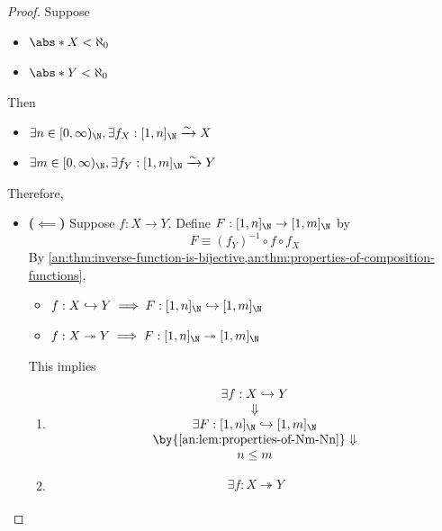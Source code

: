 \begin{proof}
  Suppose
  \begin{itemize}
    \item $\abs*{X} < \aleph_{0}$
    \item $\abs*{Y} < \aleph_{0}$
  \end{itemize}
  Then
  \begin{itemize}
    \item $\exists n \in [0, \infty)_{\N}, \exists f_{X}: [1, n]_{\N} \xrightarrow{\sim} X$
    \item $\exists m \in [0, \infty)_{\N}, \exists f_{Y}: [1, m]_{\N} \xrightarrow{\sim} Y$
  \end{itemize}
  Therefore,
  \begin{itemize}
    \item \textbf{($\impliedby$)} Suppose $f: X \to Y$. Define $F: [1, n]_{\N} \to [1, m]_{\N}$ by
          \[
            F \equiv (f_{Y})^{-1} \circ f \circ f_{X}
          \]
          By \cref{an:thm:inverse-function-is-bijective,an:thm:properties-of-composition-functions},
          \begin{itemize}
            \item $f: X \hookrightarrow Y \implies F: [1, n]_{\N} \hookrightarrow [1, m]_{\N}$
            \item $f: X \twoheadrightarrow Y \implies F: [1, n]_{\N} \twoheadrightarrow [1, m]_{\N}$
          \end{itemize}
          This implies
          \begin{enumerate}[label=\textbf{(\Alph*)}]
            \item
                  \[
                    \begin{array}{c}
                      \exists f: X \hookrightarrow Y                     \\
                      \Downarrow                                         \\
                      \exists F: [1, n]_{\N} \hookrightarrow [1, m]_{\N} \\
                      \by{\Cref{an:lem:properties-of-Nm-Nn}} \Downarrow  \\
                      n \leq m
                    \end{array}
                  \]
            \item
                  \[
                    \begin{array}{c}
                      \exists f: X \twoheadrightarrow Y                     \\

\end{array}\]
\end{enumerate}
\end{itemize}
\end{proof}
